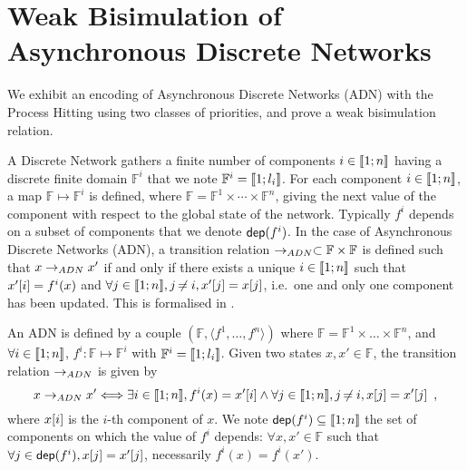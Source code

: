 
\section{Weak Bisimulation of Asynchronous Discrete Networks}
\label{suppl:demotrad}

We exhibit an encoding of Asynchronous Discrete Networks (ADN) with the Process
Hitting using two classes of priorities, and prove a weak bisimulation relation.

A Discrete Network gathers a finite number of components $i\in\llbracket 1; n \rrbracket$ having a discrete finite domain
$\mathbb F^i$ that we note $\mathbb{F}^i = \llbracket 1; l_i \rrbracket$.
For each component $i\in\llbracket 1; n \rrbracket$, a map $\mathbb F \mapsto \mathbb F^i$ is defined, where
$\mathbb F = \mathbb F^1 \times \cdots \times \mathbb F^n$, giving the next value of the component
with respect to the global state of the network.
Typically $f^i$ depends on a subset of components that we denote $\mathsf{dep}(f^i)$.
In the case of Asynchronous Discrete Networks (ADN), a transition relation $\rightarrow_{ADN}\subset \mathbb
F\times \mathbb F$ is defined such that $x\rightarrow_{ADN} x'$ if and only if there exists a unique
$i\in\llbracket 1; n \rrbracket$ such that $x'[{i}]=f^i(x)$ and $\forall j\in\llbracket 1; n \rrbracket, j\not\nobreak\mkern -2mu = i, x'[{j}]
=x[{j}]$, i.e.~one and only one component has been updated.
This is formalised in .

\begin{definition}
\label{def:DN}
  An ADN is defined by a couple $(\mathbb F, \langle f^1, \dots, f^n \rangle)$
  where $\mathbb{F} = \mathbb{F}^1\times\dots\times\mathbb{F}^n$,
  and $\forall i\in\llbracket 1; n \rrbracket$,
  $f^i: \mathbb{F} \mapsto \mathbb{F}^i$ with
  $\mathbb{F}^i = \llbracket 1; l_i \rrbracket$.
  Given two states $x,x'\in\mathbb F$, the transition relation $\rightarrow_{ADN}$ is given by
  \[
  x\rightarrow_{ADN} x' \Longleftrightarrow
    \exists i\in\llbracket 1; n \rrbracket, f^i(x)=x'[{i}]
    \wedge \forall j\in\llbracket 1; n \rrbracket, j\not\nobreak\mkern -2mu = i, x[{j}]=x'[{j}]
  \enspace,
  \]
  where $x[{i}]$ is the $i$-th component of $x$.
  We note $\mathsf{dep}(f^i)\subseteq \llbracket 1; n \rrbracket$ the set of components on which the value of $f^i$
  depends: $\forall x,x'\in \mathbb F$ such that $\forall
  j\in\mathsf{dep}(f^i), x[{j}]=x'[{j}]$, necessarily $f^i(x)=f^i(x')$.
\end{definition}

